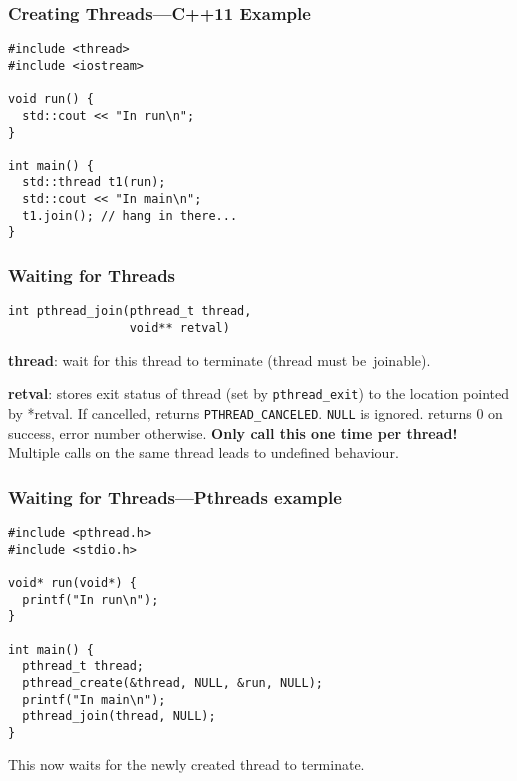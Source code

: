 \documentclass[aspectratio=43]{beamer}
\newenvironment{changemargin}[1]{%
  \begin{list}{}{%
    \setlength{\topsep}{0pt}%
    \setlength{\leftmargin}{#1}%
    \setlength{\rightmargin}{1em}
    \setlength{\listparindent}{\parindent}%
    \setlength{\itemindent}{\parindent}%
    \setlength{\parsep}{\parskip}%
  }%
  \item[]}{\end{list}}
\begin{document}
\begin{frame}[fragile]
  \frametitle{Creating Threads---C++11 Example}

  \begin{changemargin}{1.5cm}
\begin{lstlisting}
#include <thread>
#include <iostream>

void run() {
  std::cout << "In run\n";
}

int main() {
  std::thread t1(run);
  std::cout << "In main\n";
  t1.join(); // hang in there...
}
\end{lstlisting}
  \end{changemargin}
\end{frame}


\begin{frame}[fragile]
  \frametitle{Waiting for Threads}

  \begin{changemargin}{1cm}
  \begin{lstlisting}
int pthread_join(pthread_t thread,
                 void** retval)
  \end{lstlisting}
  \vfill
  {\bf thread}: wait for this thread to terminate (thread must be~joinable).

  {\bf retval}: stores exit status of thread (set by {\tt pthread\_exit}) to
                 the location pointed by *retval. If cancelled, returns
                 {\tt PTHREAD\_CANCELED}. {\tt NULL} is ignored.
  \vfill
  returns 0 on success, error number otherwise.
  \vfill
  {\bf Only call this one time per thread!} Multiple calls on the same thread
  leads to undefined behaviour.
  \end{changemargin}
\end{frame}

\begin{frame}[fragile]
  \frametitle{Waiting for Threads---Pthreads example}

\begin{changemargin}{1.5cm}
\begin{lstlisting}
#include <pthread.h>
#include <stdio.h>

void* run(void*) {
  printf("In run\n");
}

int main() {
  pthread_t thread;
  pthread_create(&thread, NULL, &run, NULL);
  printf("In main\n");
  pthread_join(thread, NULL);
}
\end{lstlisting}
  \vfill
  This now waits for the newly created thread to terminate.
\end{changemargin}
\end{frame}
\end{document}
